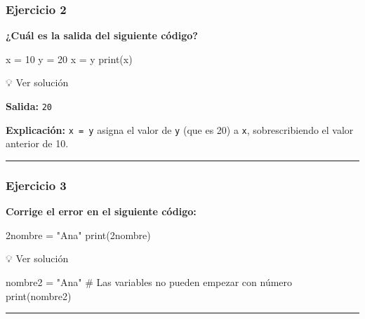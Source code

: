 \documentclass[
  doc,
  floatsintext,
  longtable,
  a4paper,
  nolmodern,
  notxfonts,
  notimes,
  12pt,
  colorlinks=true,linkcolor=blue,citecolor=blue,urlcolor=blue]{apa7}
\newenvironment{Shaded}{\begin{snugshade}}{\end{snugshade}}
\newcommand{\BuiltInTok}[1]{\textcolor[rgb]{0.00,0.23,0.31}{#1}}
\newcommand{\CommentTok}[1]{\textcolor[rgb]{0.37,0.37,0.37}{#1}}
\newcommand{\DecValTok}[1]{\textcolor[rgb]{0.68,0.00,0.00}{#1}}
\newcommand{\ErrorTok}[1]{\textcolor[rgb]{0.68,0.00,0.00}{#1}}
\newcommand{\NormalTok}[1]{\textcolor[rgb]{0.00,0.23,0.31}{#1}}
\newcommand{\OperatorTok}[1]{\textcolor[rgb]{0.37,0.37,0.37}{#1}}
\newcommand{\StringTok}[1]{\textcolor[rgb]{0.13,0.47,0.30}{#1}}
\begin{document}
\subsubsection{Ejercicio 2}\label{ejercicio-2}

\textbf{¿Cuál es la salida del siguiente código?}

\begin{Shaded}
\begin{Highlighting}[]
\NormalTok{x }\OperatorTok{=} \DecValTok{10}
\NormalTok{y }\OperatorTok{=} \DecValTok{20}
\NormalTok{x }\OperatorTok{=}\NormalTok{ y}
\BuiltInTok{print}\NormalTok{(x)}
\end{Highlighting}
\end{Shaded}

💡 Ver solución

\textbf{Salida:} \texttt{20}

\textbf{Explicación:} \texttt{x\ =\ y} asigna el valor de \texttt{y}
(que es 20) a \texttt{x}, sobrescribiendo el valor anterior de 10.

\begin{center}\rule{0.5\linewidth}{0.5pt}\end{center}

\subsubsection{Ejercicio 3}\label{ejercicio-3}

\textbf{Corrige el error en el siguiente código:}

\begin{Shaded}
\begin{Highlighting}[]
\DecValTok{2}\ErrorTok{nombre} \OperatorTok{=} \StringTok{"Ana"}
\BuiltInTok{print}\NormalTok{(}\DecValTok{2}\ErrorTok{nombre}\NormalTok{)}
\end{Highlighting}
\end{Shaded}

💡 Ver solución

\begin{Shaded}
\begin{Highlighting}[]
\NormalTok{nombre2 }\OperatorTok{=} \StringTok{"Ana"}  \CommentTok{\# Las variables no pueden empezar con número}
\BuiltInTok{print}\NormalTok{(nombre2)}
\end{Highlighting}
\end{Shaded}

\begin{center}\rule{0.5\linewidth}{0.5pt}\end{center}
\end{document}
